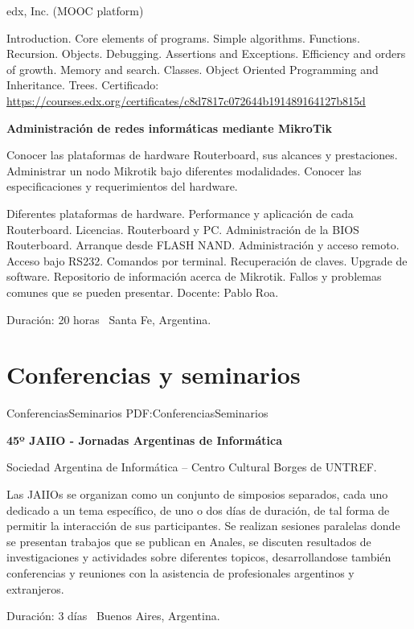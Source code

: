 \documentclass[letterpaper,MMMyyyy,nonstop]{simpleresumecv}
\begin{document}
\begin{body}
\BulletItem  edx, Inc. (MOOC platform)
\begin{detail}
	\SubBulletItem
	Introduction. Core elements of programs. Simple algorithms. Functions. Recursion. Objects. Debugging. Assertions and Exceptions. Efficiency and orders of growth. Memory and search. Classes. Object Oriented Programming	and Inheritance. Trees.
	\SubBulletItem
	Certificado: \href{https://courses.edx.org/certificates/c8d7817c072644b191489164127b815d}
	{https://courses.edx.org/certificates/c8d7817c072644b191489164127b815d}
	
\end{detail}


\BigGap
\textbf{Administración de redes informáticas mediante MikroTik}
\hfill
{}

\BulletItem Conocer las plataformas de hardware Routerboard, sus alcances y prestaciones. Administrar un nodo Mikrotik bajo diferentes modalidades. Conocer las especificaciones y requerimientos del hardware.
\begin{detail}
	\SubBulletItem 
	Diferentes plataformas de hardware. Performance y aplicación de cada Routerboard. Licencias. Routerboard y PC. Administración de la BIOS Routerboard. Arranque desde FLASH NAND. Administración y acceso remoto. Acceso bajo RS232. Comandos por terminal. Recuperación de claves. Upgrade de software. Repositorio de información acerca de Mikrotik. Fallos y problemas comunes que se pueden presentar.
	\SubBulletItem Docente: Pablo Roa.
\end{detail}
Duración: 20 horas \SubBulletSymbol\, Santa Fe, Argentina.




\section{Conferencias \newline y seminarios}
{ConferenciasSeminarios}
{PDF:ConferenciasSeminarios}


\textbf{45º JAIIO - Jornadas Argentinas de Informática}
\hfill
{}

\BulletItem Sociedad Argentina de Informática – Centro Cultural Borges de UNTREF.
\begin{detail}
	\SubBulletItem
	Las JAIIOs se organizan como un conjunto de simposios separados, cada uno dedicado a un tema específico, de uno o dos días de duración, de tal forma de permitir la interacción de sus participantes. Se realizan sesiones paralelas donde se presentan trabajos que se publican en Anales, se discuten resultados de investigaciones y actividades sobre diferentes topicos, desarrollandose también conferencias y reuniones con la asistencia de profesionales argentinos y extranjeros.
\end{detail}
Duración: 3 días \SubBulletSymbol\, Buenos Aires, Argentina.


\end{body}
\end{document}
